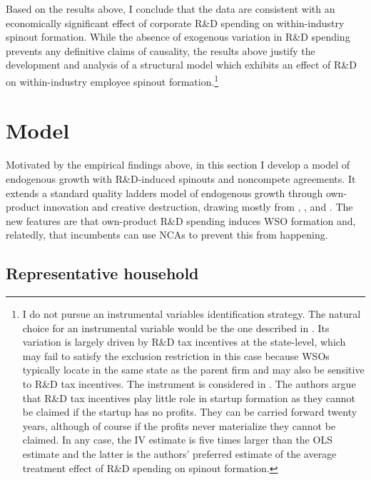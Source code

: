 \documentclass[ecta,nameyear,final]{econsocart}
\theoremstyle{plain}
\theoremstyle{remark}
\begin{document}
Based on the results above, I conclude that the data are consistent with an economically significant effect of corporate R\&D spending on within-industry spinout formation. While the absence of exogenous variation in R\&D spending prevents any definitive claims of causality, the results above justify the development and analysis of a structural model which exhibits an effect of R\&D on within-industry employee spinout formation.\footnote{I do not pursue an instrumental variables identification strategy. The natural choice for an instrumental variable would be the one described in \cite{bloom_identifying_2013}. Its variation is largely driven by R\&D tax incentives at the state-level, which may fail to satisfy the exclusion restriction in this case because WSOs typically locate in the same state as the parent firm and may also be sensitive to R\&D tax incentives. The instrument is considered in \cite{babina_entrepreneurial_2019}. The authors argue that R\&D tax incentives play little role in startup formation as they cannot be claimed if the startup has no profits. They can be carried forward twenty years, although of course if the profits never materialize they cannot be claimed. In any case, the IV estimate is five times larger than the OLS estimate and the latter is the authors' preferred estimate of the average treatment effect of R\&D spending on spinout formation.}  

\section{Model}\label{sec:model}

Motivated by the empirical findings above, in this section I develop a model of endogenous growth with R\&D-induced spinouts and noncompete agreements. It extends a standard quality ladders model of endogenous growth through own-product innovation and creative destruction, drawing mostly from \cite{grossman_quality_1991}, \cite{acemoglu_innovation_2015}, and \cite{akcigit_growth_2018}. The new features are that own-product R\&D spending induces WSO formation and, relatedly, that incumbents can use NCAs to prevent this from happening.

\subsection{Representative household}
\end{document}
